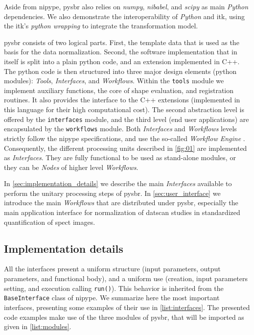 \documentclass{frontiers}
\begin{document}
Aside from \gls*{nipype}, \Gls*{pysbr} also relies on \emph{numpy},
  \emph{nibabel}, and \emph{scipy} as main \emph{Python} dependencies.
We also demonstrate the interoperability of \emph{Python} and \gls*{itk},
  using the \gls*{itk}'s \emph{python wrapping} to integrate the
  transformation model. %

\Gls*{pysbr} consists of two logical parts.
First, the template data that is used as the basis for the data normalization.
Second, the software implementation that in itself is split into a plain
  python code, and an extension implemented in C++.
The python code is then structured into three major design elements (python modules):
  \emph{Tools}, \emph{Interfaces}, and \emph{Workflows}.
Within the \texttt{tools} module we implement auxiliary functions,
    the core of shape evaluation, and registration routines.
It also provides the interface to the C++ extensions
    (implemented in this language for their high computational cost).
The second abstraction level is offered by the \texttt{interfaces} module, and
  the third level (end user applications) are encapsulated by the \texttt{workflows} module.
Both \emph{Interfaces} and \emph{Workflows} levels strictly follow the
  \gls*{nipype} specifications, and use the so-called \emph{Workflow Engine}
  \citep{gorgolewski_nipype:_2011}.
Consequently, the different processing units described in \autoref{fig:01} 
  are implemented as \emph{Interfaces}. 
They are fully functional to be used as stand-alone modules, or 
  they can be \emph{Nodes} of higher level \emph{Workflows}.
  
In \autoref{sec:implementation_details} we describe the main \emph{Interfaces}
  available to perform the unitary processing steps of \gls*{pysbr}.
In \autoref{sec:user_interface} we introduce the main \emph{Workflows} that are
  distributed under \gls*{pysbr}, especially the main application interface
  for normalization of \gls*{datscan} studies in standardized
  quantification of \gls*{spect} images.

\subsection{Implementation details}
\label{sec:implementation_details}

All the interfaces present a uniform structure (input parameters, output parameters,
  and functional body), and a uniform use (creation, input parameters setting, and
  execution calling \texttt{run()}).
This behavior is inherited from the \texttt{BaseInterface} class of \gls*{nipype}.
We summarize here the most important interfaces,
  presenting some examples of their use in \autoref{list:interfaces}.
The presented code examples make use of the three modules of 
  \gls*{pysbr}, that will be imported as given in \autoref{list:modules}.
  
\end{document}
